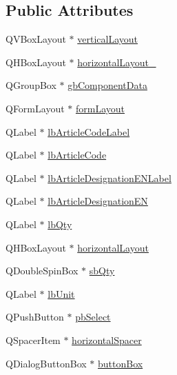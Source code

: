 \subsection*{Public Attributes}
\begin{DoxyCompactItemize}
\item 
Q\-V\-Box\-Layout $\ast$ \hyperlink{class_ui__mdt_cl_article_component_dialog_a6b4d1dd089ef4bc86bb4bd1913985e80}{vertical\-Layout}
\item 
Q\-H\-Box\-Layout $\ast$ \hyperlink{class_ui__mdt_cl_article_component_dialog_a64640a37e9c0ed888bc23d0dd4268b2f}{horizontal\-Layout\-\_}
\item 
Q\-Group\-Box $\ast$ \hyperlink{class_ui__mdt_cl_article_component_dialog_aa35268caddcc05ebeaf50dc9c0927668}{gb\-Component\-Data}
\item 
Q\-Form\-Layout $\ast$ \hyperlink{class_ui__mdt_cl_article_component_dialog_af78d852c4134103f3e3a3d60ea082468}{form\-Layout}
\item 
Q\-Label $\ast$ \hyperlink{class_ui__mdt_cl_article_component_dialog_af636935739685768b44097d1c391bd21}{lb\-Article\-Code\-Label}
\item 
Q\-Label $\ast$ \hyperlink{class_ui__mdt_cl_article_component_dialog_aed003c393f0f7343d5510d6120847f79}{lb\-Article\-Code}
\item 
Q\-Label $\ast$ \hyperlink{class_ui__mdt_cl_article_component_dialog_a977d617bb065a68cc420fbc4dcc74565}{lb\-Article\-Designation\-E\-N\-Label}
\item 
Q\-Label $\ast$ \hyperlink{class_ui__mdt_cl_article_component_dialog_a37234972b732316dc0ab68ae949e7b48}{lb\-Article\-Designation\-E\-N}
\item 
Q\-Label $\ast$ \hyperlink{class_ui__mdt_cl_article_component_dialog_aa9b82d5b45f45c5db3d5d2755cb28ecb}{lb\-Qty}
\item 
Q\-H\-Box\-Layout $\ast$ \hyperlink{class_ui__mdt_cl_article_component_dialog_a95b03ea46cabbb65548ddbc1111e108d}{horizontal\-Layout}
\item 
Q\-Double\-Spin\-Box $\ast$ \hyperlink{class_ui__mdt_cl_article_component_dialog_a94d59140974b961351cb510dcef99581}{sb\-Qty}
\item 
Q\-Label $\ast$ \hyperlink{class_ui__mdt_cl_article_component_dialog_ad2128847a4dc9f61b0bacfdb63ab5e25}{lb\-Unit}
\item 
Q\-Push\-Button $\ast$ \hyperlink{class_ui__mdt_cl_article_component_dialog_a6f056c17aa9c33369e6a14677e2805a2}{pb\-Select}
\item 
Q\-Spacer\-Item $\ast$ \hyperlink{class_ui__mdt_cl_article_component_dialog_ad73c7271cf228bae1dc3130b08591ecf}{horizontal\-Spacer}
\item 
Q\-Dialog\-Button\-Box $\ast$ \hyperlink{class_ui__mdt_cl_article_component_dialog_a00c3ea8ad19edee72b7d89a3a73cdfe1}{button\-Box}
\end{DoxyCompactItemize}


